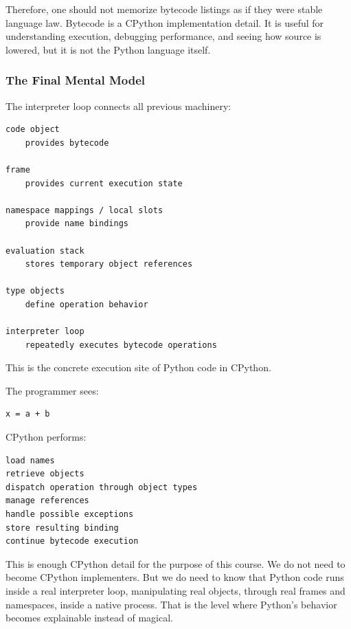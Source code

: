 Therefore, one should not memorize bytecode listings as if they were stable language law. Bytecode is a CPython implementation detail. It is useful for understanding execution, debugging performance, and seeing how source is lowered, but it is not the Python language itself.

\subsubsection{The Final Mental Model}

The interpreter loop connects all previous machinery:

\begin{verbatim}
code object
    provides bytecode

frame
    provides current execution state

namespace mappings / local slots
    provide name bindings

evaluation stack
    stores temporary object references

type objects
    define operation behavior

interpreter loop
    repeatedly executes bytecode operations
\end{verbatim}

This is the concrete execution site of Python code in CPython.

The programmer sees:

\begin{verbatim}
x = a + b
\end{verbatim}

CPython performs:

\begin{verbatim}
load names
retrieve objects
dispatch operation through object types
manage references
handle possible exceptions
store resulting binding
continue bytecode execution
\end{verbatim}

This is enough CPython detail for the purpose of this course. We do not need to become CPython implementers. But we do need to know that Python code runs inside a real interpreter loop, manipulating real objects, through real frames and namespaces, inside a native process. That is the level where Python's behavior becomes explainable instead of magical.
